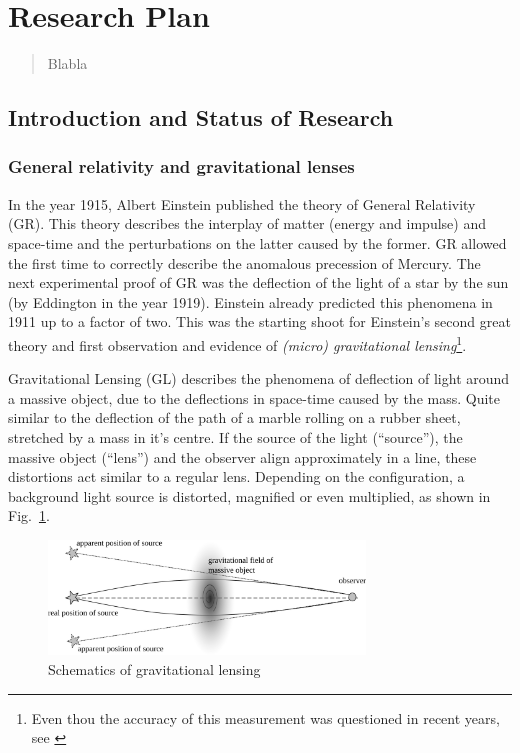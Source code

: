 \documentclass[11pt]{article}
\begin{document}
\newpage

\section*{Research Plan}

\begin{abstract}
Blabla
\end{abstract}


\subsection{Introduction and Status of Research}

\subsubsection{General relativity and gravitational lenses}

In the year 1915, Albert Einstein published the theory of General Relativity (GR).
This theory describes the interplay of matter (energy and impulse) and space-time and the perturbations on the latter caused by the former.
GR allowed the first time to correctly describe the anomalous precession of Mercury.
The next experimental proof of GR was the deflection of the light of a star by the sun (by Eddington in the year 1919).
Einstein already predicted this phenomena in 1911 up to a factor of two.
This was the starting shoot for Einstein’s second great theory and first observation and evidence of \emph{(micro) gravitational lensing}\footnote{Even thou the accuracy of this measurement was questioned in recent years, see \cite{kennefick2009testing}}.

Gravitational Lensing (GL) describes the phenomena of deflection of light around a massive object, due to the deflections in space-time caused by the mass.
Quite similar to the deflection of the path of a marble rolling on a rubber sheet, stretched by a mass in it's centre.
If the source of the light (``source''), the massive object (``lens'') and the observer align approximately in a line, these distortions act similar to a regular lens.
Depending on the configuration, a background light source is distorted, magnified or even multiplied, as shown in Fig.~\ref{fig:grav_lens}.

\begin{figure}[h]
	\centering
		\includegraphics[width=0.75\textwidth]{img/grav_lens}
	\caption{Schematics of gravitational lensing}
	\label{fig:grav_lens}
\end{figure}
\end{document}
